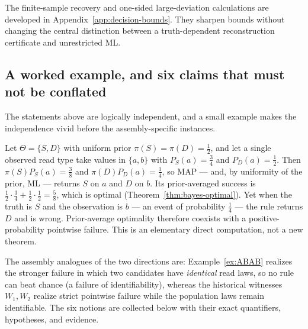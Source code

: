 The finite-sample recovery and one-sided large-deviation calculations
are developed in Appendix~\ref{app:decision-bounds}. They sharpen
bounds without changing the central distinction between a
truth-dependent reconstruction certificate and unrestricted ML.

\subsection{A worked example, and six claims that must not be conflated}
\label{sec:five-claims}

The statements above are logically independent, and a small example makes the
independence vivid before the assembly-specific instances.

\begin{example}
\label{ex:worked-bayes}
Let $\Theta=\{S,D\}$ with uniform prior $\pi(S)=\pi(D)=\tfrac12$, and let a
single observed read type take values in $\{a,b\}$ with $P_S(a)=\tfrac34$ and
$P_D(a)=\tfrac12$. Then $\pi(S)P_S(a)=\tfrac38$ and
$\pi(D)P_D(a)=\tfrac14$, so MAP --- and, by uniformity of the prior, ML ---
returns $S$ on $a$ and $D$ on $b$. Its prior-averaged success is
$\tfrac12\cdot\tfrac34+\tfrac12\cdot\tfrac12=\tfrac58$, which is optimal
(Theorem~\ref{thm:bayes-optimal}). Yet when the truth is $S$ and the
observation is $b$ --- an event of probability $\tfrac14$ --- the rule returns
$D$ and is wrong. Prior-average optimality therefore coexists with a
positive-probability pointwise failure. This is an elementary direct
computation, not a new theorem.
\end{example}

The assembly analogues of the two directions are: Example~\ref{ex:ABAB}
realizes the stronger failure in which two candidates have \emph{identical}
read laws, so no rule can beat chance (a failure of identifiability), whereas
the historical witnesses $W_1,W_2$ realize strict pointwise failure while the
population laws remain identifiable. The six notions are collected below with
their exact quantifiers, hypotheses, and evidence.

